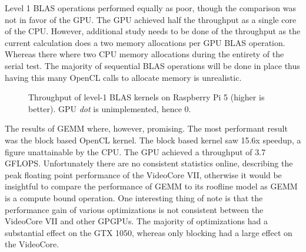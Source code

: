 \documentclass[conference]{IEEEtran}
\begin{document}
Level 1 BLAS operations performed equally as poor, though the comparison was not in favor of the GPU. The 
GPU achieved half the throughput as a single core of the CPU. However, additional study needs to be done of the 
throughput as the current calculation does a two memory allocations per GPU BLAS operation. Whereas there 
where two CPU memory allocations during the entirety of the serial test. The majority of sequential 
BLAS operations will be done in place thus having this many OpenCL calls to allocate memory is unrealistic.


\begin{figure}[t]
  \centering
  \caption{Throughput of level-1 BLAS kernels on Raspberry Pi 5  
           (higher is better).  GPU \textit{dot} is unimplemented, hence 0.}
  \label{fig:blas_gflops}
\end{figure}


The results of GEMM where, however, promising. The most performant result was the block based 
OpenCL kernel. The block based kernel saw 15.6x speedup, a figure unattainable by the CPU. The 
GPU achieved a throughput of 3.7 GFLOPS. Unfortunately there are no consistent statistics online,
describing the peak floating point performance of the VideoCore VII, otherwise it would be insightful 
to compare the performance of GEMM to its roofline model as GEMM is a compute bound operation. One 
interesting thing of note is that the performance gain of various optimizations is not consistent between 
the VideoCore VII and other GPGPUs. The majority of optimizations had a substantial effect on the GTX 1050, 
whereas only blocking had a large effect on the VideoCore.
\end{document}
